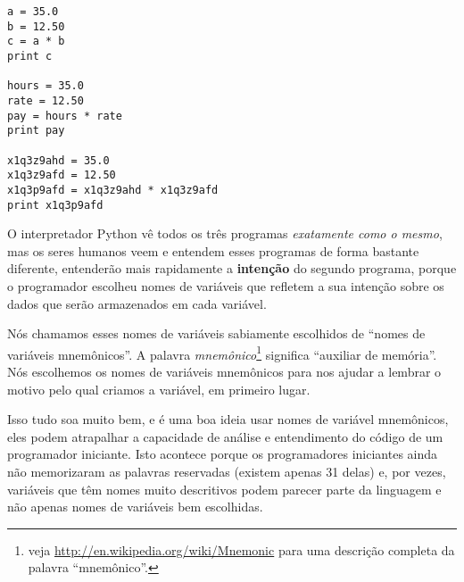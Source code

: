 {{{{{{{{{{{{{{{{{\beforeverb
\begin{verbatim}
a = 35.0
b = 12.50
c = a * b
print c

hours = 35.0
rate = 12.50
pay = hours * rate
print pay

x1q3z9ahd = 35.0
x1q3z9afd = 12.50
x1q3p9afd = x1q3z9ahd * x1q3z9afd
print x1q3p9afd
\end{verbatim}
\afterverb
%

O interpretador Python vê todos os três programas \emph{exatamente como o 
mesmo}, mas os seres humanos veem e entendem esses programas de forma bastante 
diferente, entenderão mais rapidamente a {\bf intenção} do segundo programa, porque o 
programador escolheu nomes de variáveis que refletem a sua intenção
sobre os dados que serão armazenados em cada variável.

Nós chamamos esses nomes de variáveis sabiamente escolhidos de ``nomes de 
variáveis mnemônicos''. A palavra \emph{mnemônico}\footnote{veja 
\url{http://en.wikipedia.org/wiki/Mnemonic} para uma descrição completa da 
palavra ``mnemônico''.} significa ``auxiliar de memória''. 
Nós escolhemos os nomes de variáveis mnemônicos para nos ajudar a lembrar o motivo 
pelo qual criamos a variável, em primeiro lugar.

Isso tudo soa muito bem, e é uma boa ideia usar nomes de variável mnemônicos, 
eles podem atrapalhar a capacidade de análise e 
entendimento do código de um programador iniciante. Isto acontece porque os programadores iniciantes 
ainda não memorizaram as palavras reservadas (existem apenas 31 delas) e, por vezes, 
variáveis que têm nomes muito descritivos podem parecer 
parte da linguagem e não apenas nomes de variáveis bem escolhidas.

}}}}}}}}}}}}}}}}}
